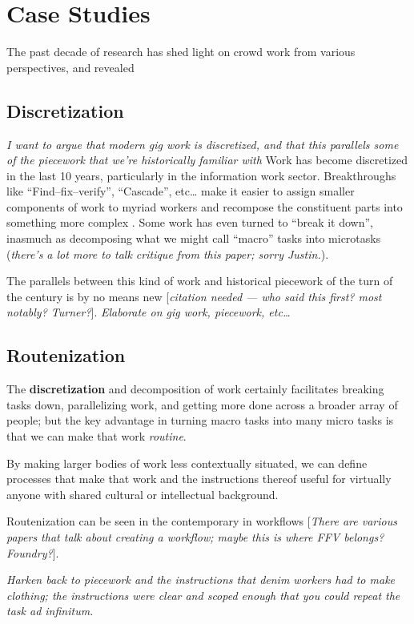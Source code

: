 \documentclass{sigchi}
\begin{document}
\section{Case Studies}
The past decade of research has shed light on crowd work from various perspectives,
and revealed 
\subsection{Discretization}
\textit{I want to argue that modern gig work is discretized,
and that this parallels some of the piecework that we're historically familiar with}
Work has become discretized in the last 10 years, particularly in the information work sector.
Breakthroughs like ``Find--fix--verify'', ``Cascade'', etc\dots
make it easier to assign smaller components of work to myriad workers and
recompose the constituent parts into something more complex
\cite{bernstein2015soylent,chilton2013cascade}.
Some work has even turned to ``break it down'',
inasmuch as decomposing what we might call ``macro'' tasks into microtasks
\cite{cheng2015break}
(\textit{there's a lot more to talk critique from this paper; sorry Justin.}).

The parallels between this kind of work and
historical piecework of the turn of the  century
is by no means new
[\textit{citation needed --- who said this first? most notably? Turner?}].
\textit{Elaborate on gig work, piecework, etc\dots}

\subsection{Routenization}
The \textbf{discretization} and decomposition of work certainly facilitates
breaking tasks down,
parallelizing work,
and getting more done across a broader array of people;
but the key advantage in turning macro tasks 
into many micro tasks is that we can make that work \textit{routine}.

By making larger bodies of work less contextually situated,
we can define processes that make that work
and the instructions thereof
useful for virtually anyone with shared cultural or intellectual background.

Routenization can be seen in the contemporary in workflows
\cite{foundry,bernstein2015soylent}
[\textit{There are various papers that talk about creating a workflow;
maybe this is where FFV belongs? Foundry?}].

\textit{Harken back to piecework
and the instructions that denim workers had to make clothing;
the instructions were clear and scoped enough that you could repeat the task ad infinitum.}
\end{document}
